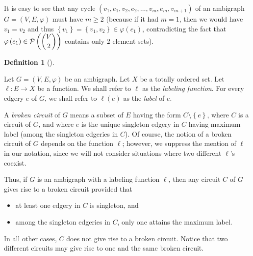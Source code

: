 \documentclass[numbers=enddot,12pt,final,onecolumn,notitlepage]{scrartcl}%
\theoremstyle{definition}
\newtheorem{defi}[theo]{Definition}
\newenvironment{definition}[1][]
{\begin{defi}[#1]\begin{leftbar}}
{\end{leftbar}\end{defi}}
\begin{document}
It is easy to see that any cycle $\left(  v_{1},e_{1},v_{2},e_{2},\ldots
,v_{m},e_{m},v_{m+1}\right)  $ of an ambigraph $G=\left(  V,E,\varphi\right)
$ must have $m\geq2$ (because if it had $m=1$, then we would have $v_{1}%
=v_{2}$ and thus $\left\{  v_{1}\right\}  =\left\{  v_{1},v_{2}\right\}
\in\varphi\left(  e_{1}\right)  $, contradicting the fact that $\varphi\left(
e_{1}\right)  \in\mathcal{P}\left(  \dbinom{V}{2}\right)  $ contains only
$2$-element sets).

\begin{definition}
\label{def.ambigraph.BC}Let $G=\left(  V,E,\varphi\right)  $ be an ambigraph.
Let $X$ be a totally ordered set. Let $\ell:E\rightarrow X$ be a function. We
shall refer to $\ell$ as the \emph{labeling function}. For every edgery $e$ of
$G$, we shall refer to $\ell\left(  e\right)  $ as the \emph{label} of $e$.

A \emph{broken circuit} of $G$ means a subset of $E$ having the form
$C\setminus\left\{  e\right\}  $, where $C$ is a circuit of $G$, and where $e$
is the unique singleton edgery in $C$ having maximum label (among the
singleton edgeries in $C$). Of course, the notion of a broken circuit of $G$
depends on the function $\ell$; however, we suppress the mention of $\ell$ in
our notation, since we will not consider situations where two different $\ell
$'s coexist.
\end{definition}

Thus, if $G$ is an ambigraph with a labeling function $\ell$, then any circuit
$C$ of $G$ gives rise to a broken circuit provided that

\begin{itemize}
\item at least one edgery in $C$ is singleton, and

\item among the singleton edgeries in $C$, only one attains the maximum label.
\end{itemize}

\noindent In all other cases, $C$ does not give rise to a broken circuit.
Notice that two different circuits may give rise to one and the same broken circuit.
\end{document}
